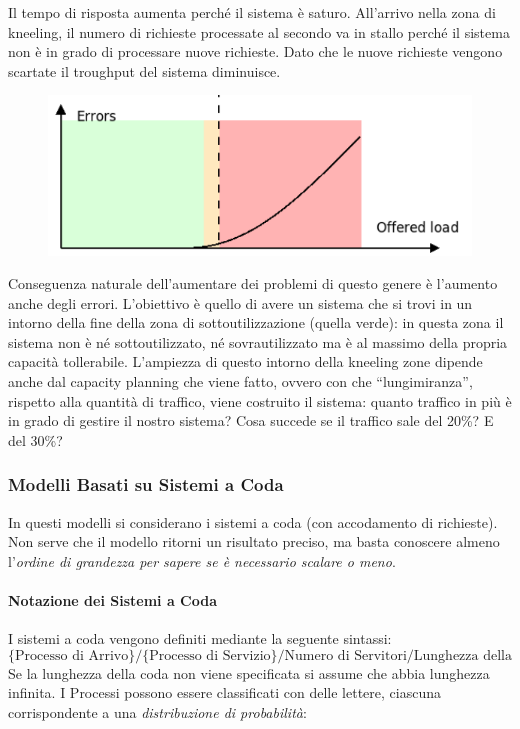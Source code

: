 \documentclass{article}
\begin{document}
		Il tempo di risposta aumenta perché il sistema è saturo. All’arrivo nella zona di kneeling, il numero di richieste processate al secondo va in stallo perché il sistema non è in grado di processare nuove richieste. Dato che le nuove richieste vengono scartate il troughput del sistema diminuisce.
		
		\begin{figure}[ht]
			\centering
			\includegraphics[width=0.7\linewidth]{SAC_D1_load3}
			\label{fig:sacd1load3}
		\end{figure}
		
		Conseguenza naturale dell’aumentare dei problemi di questo genere è l'aumento anche degli errori.
		L’obiettivo è quello di avere un sistema che si trovi in un intorno della fine della zona di sottoutilizzazione (quella verde): in questa zona il sistema non è né sottoutilizzato, né sovrautilizzato ma è al massimo della propria capacità tollerabile.
		L’ampiezza di questo intorno della kneeling zone dipende anche dal
		capacity planning che viene fatto, ovvero con che “lungimiranza”, rispetto alla quantità di traffico, viene costruito il sistema: quanto traffico in più è in grado di gestire il nostro sistema? Cosa succede se il traffico sale del 20\%? E del 30\%?
		
		
		\subsubsection{Modelli Basati su Sistemi a
			Coda}\label{modelli-basati-su-sistemi-a-coda}
		
		In questi modelli si considerano i sistemi a coda (con
		accodamento di richieste). Non serve che il modello ritorni un
		risultato preciso, ma basta conoscere almeno l'\emph{ordine di grandezza
			per sapere se è necessario scalare o meno}.
		
		\paragraph{Notazione dei Sistemi a Coda}\label{notazione-dei-sistemi-a-coda}
		I sistemi a coda vengono definiti mediante la seguente sintassi: \[
		\text{\{Processo di Arrivo\}/\{Processo di Servizio\}/Numero di Servitori/Lunghezza della Coda\}}
		\] Se la lunghezza della coda non viene specificata si assume che abbia
		lunghezza infinita. I Processi possono essere classificati con
		delle lettere, ciascuna corrispondente a una \emph{distribuzione di
			probabilità}:
		
\end{document}
